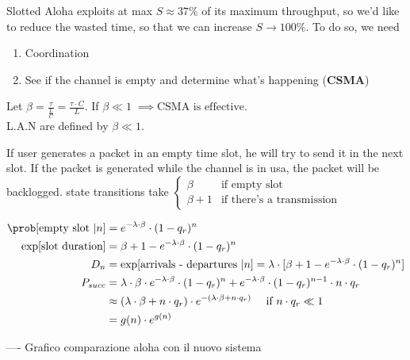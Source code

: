 Slotted Aloha exploits at max $S \approx 37 \%$ of its maximum throughput, so we'd like to reduce the wasted time,
so that we can increase $S \to 100\%$. To do so, we need
\begin{enumerate}
  \item Coordination
  \item See if the channel is empty and determine what's happening (\textbf{CSMA})
\end{enumerate}

Let $\beta = \frac{\tau}{\frac{L}{C}} = \frac{\tau \cdot C}{L}$. If $\beta \ll 1 \; \implies \text{CSMA is effective}$. \\
L.A.N are defined by $\beta \ll 1$.

If user generates a packet in an empty time slot, he will try to send it in the next slot. If the packet is generated while the channel is in usa, the packet will be backlogged.
state transitions take $\begin{cases}
  \beta & \text{if empty slot} \\
  \beta + 1 & \text{if there's a transmission}
\end{cases}$

\begin{equation}\begin{split}
  \prob[\text{empty slot }|n] &= e^{-\lambda \cdot \beta} \cdot (1-q_r)^n \\
  \exp[\text{slot duration}] &= \beta + 1 - e^{-\lambda \cdot \beta} \cdot (1-q_r)^n \\
  D_n &= \exp[\text{arrivals - departures }|n ]= \lambda \cdot [\beta + 1 - e^{-\lambda \cdot \beta} \cdot (1-q_r)^n ]\\
  P_{succ} &= \lambda \cdot \beta \cdot e^{-\lambda \cdot \beta} \cdot (1-q_r)^n + e^{-\lambda \cdot \beta} \cdot (1-q_r)^{n-1} \cdot n \cdot q_r \\
  &\approx (\lambda \cdot \beta + n \cdot q_r) \cdot e^{-(\lambda \cdot \beta + n \cdot q_r)} \quad \text{ if } n \cdot q_r \ll 1 \\
  &= g(n) \cdot e^{g(n)}
\end{split}\end{equation}

---- Grafico comparazione aloha con il nuovo sistema

